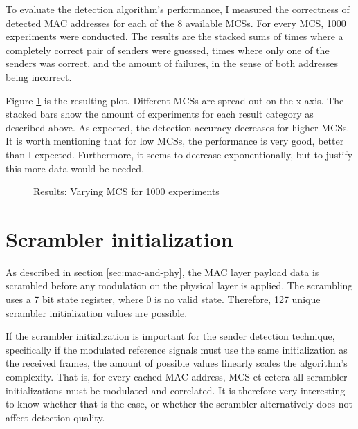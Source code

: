 To evaluate the detection algorithm's performance, I measured the correctness of detected MAC addresses for each of the 8 available \glspl{MCS}. For every \gls{MCS}, 1000 experiments were conducted. The results are the stacked sums of times where a completely correct pair of senders were guessed, times where only one of the senders was correct, and the amount of failures, in the sense of both addresses being incorrect.

Figure \ref{fig:vary_mcs} is the resulting plot. Different \glspl{MCS} are spread out on the x axis. The stacked bars show the amount of experiments for each result category as described above. As expected, the detection accuracy decreases for higher \glspl{MCS}. It is worth mentioning that for low \glspl{MCS}, the performance is very good, better than I expected. Furthermore, it seems to decrease exponentionally, but to justify this more data would be needed.

\begin{figure}[H]
	\centering
	\setlength\figureheight{5cm}
	\setlength{}
	
	\caption{Results: Varying MCS for 1000 experiments}
	\label{fig:vary_mcs}
\end{figure}



\section{Scrambler initialization}\label{sec:ex-scrambler}

As described in section \ref{sec:mac-and-phy}, the MAC layer payload data is scrambled before any modulation on the physical layer is applied. The scrambling uses a 7 bit state register, where 0 is no valid state. Therefore, 127 unique scrambler initialization values are possible.

If the scrambler initialization is important for the sender detection technique, specifically if the modulated reference signals must use the same initialization as the received frames, the amount of possible values linearly scales the algorithm's complexity. That is, for every cached MAC address, \gls{MCS} et cetera all scrambler initializations must be modulated and correlated. It is therefore very interesting to know whether that is the case, or whether the scrambler alternatively does not affect detection quality.\\

